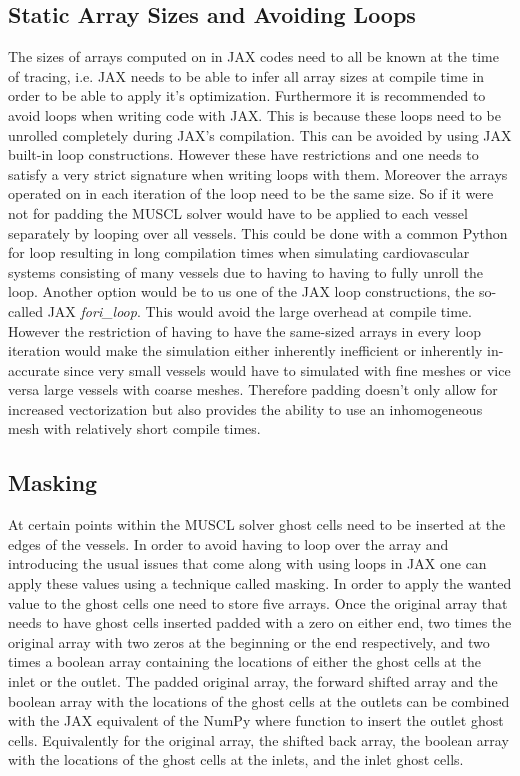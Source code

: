 \documentclass[a4paper, oneside]{discothesis}
\begin{document}
							\subsection{Static Array Sizes and Avoiding Loops} \label{sec:al}
							The sizes of arrays computed on in JAX codes need to all be known at the time of tracing, i.e. JAX needs to be able to infer all array sizes at compile time in order to be able to apply it's optimization.
							Furthermore it is recommended to avoid loops when writing code with JAX.
							This is because these loops need to be unrolled completely during JAX's compilation.
							This can be avoided by using JAX built-in loop constructions.
							However these have restrictions and one needs to satisfy a very strict signature when writing loops with them.
							Moreover the arrays operated on in each iteration of the loop need to be the same size.
							So if it were not for padding the MUSCL solver would have to be applied to each vessel separately by looping over all vessels.
							This could be done with a common Python for loop resulting in long compilation times when simulating cardiovascular systems consisting of many vessels due to having to having to fully unroll the loop.
							Another option would be to us one of the JAX loop constructions, the so-called JAX \emph{fori\_loop}.
							This would avoid the large overhead at compile time.
							However the restriction of having to have the same-sized arrays in every loop iteration would make the simulation either inherently inefficient or inherently in-accurate since very small vessels would have to simulated with fine meshes or vice versa large vessels with coarse meshes.
							Therefore padding doesn't only allow for increased vectorization but also provides the ability to use an inhomogeneous mesh with relatively short compile times.

							\subsection{Masking} \label{sec:msk}
							At certain points within the MUSCL solver ghost cells need to be inserted at the edges of the vessels.
							In order to avoid having to loop over the array and introducing the usual issues that come along with using loops in JAX one can apply these values using a technique called masking.
							In order to apply the wanted value to the ghost cells one need to store five arrays.
							Once the original array that needs to have ghost cells inserted padded with a zero on either end, two times the original array with two zeros at the beginning or the end respectively, and two times a boolean array containing the locations of either the ghost cells at the inlet or the outlet.
							The padded original array, the forward shifted array and the boolean array with the locations of the ghost cells at the outlets can be combined with the JAX equivalent of the NumPy where function to insert the outlet ghost cells.
							Equivalently for the original array, the shifted back array, the boolean array with the locations of the ghost cells at the inlets, and the inlet ghost cells.
\end{document}
